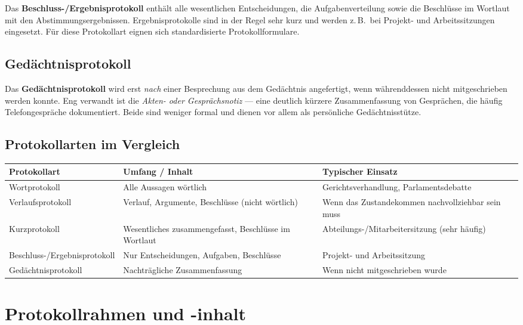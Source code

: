 \documentclass[11pt, a4paper]{article}
\begin{document}
Das \textbf{Beschluss-/Ergebnisprotokoll} enthält alle wesentlichen Entscheidungen, die
Aufgabenverteilung sowie die Beschlüsse im Wortlaut mit den Abstimmungsergebnissen.
Ergebnisprotokolle sind in der Regel sehr kurz und werden z.\,B.\ bei Projekt- und
Arbeitssitzungen eingesetzt. Für diese Protokollart eignen sich standardisierte
Protokollformulare.

\subsection{Gedächtnisprotokoll}

Das \textbf{Gedächtnisprotokoll} wird erst \emph{nach} einer Besprechung aus dem
Gedächtnis angefertigt, wenn währenddessen nicht mitgeschrieben werden konnte. Eng
verwandt ist die \emph{Akten- oder Gesprächsnotiz} --- eine deutlich kürzere
Zusammenfassung von Gesprächen, die häufig Telefongespräche dokumentiert. Beide sind
weniger formal und dienen vor allem als persönliche Gedächtnisstütze.

\subsection{Protokollarten im Vergleich}

\begin{center}
\begin{tabular}{p{3.0cm} p{4.3cm} p{4.7cm}}
\toprule
\textbf{Protokollart} & \textbf{Umfang / Inhalt} & \textbf{Typischer Einsatz}\\
\midrule
Wortprotokoll & Alle Aussagen wörtlich & Gerichtsverhandlung, Parlamentsdebatte\\
Verlaufsprotokoll & Verlauf, Argumente, Beschlüsse (nicht wörtlich) & Wenn das Zustandekommen nachvollziehbar sein muss\\
Kurzprotokoll & Wesentliches zusammengefasst, Beschlüsse im Wortlaut & Abteilungs-/Mitarbeitersitzung (sehr häufig)\\
Beschluss-/Ergebnisprotokoll & Nur Entscheidungen, Aufgaben, Beschlüsse & Projekt- und Arbeitssitzung\\
Gedächtnisprotokoll & Nachträgliche Zusammenfassung & Wenn nicht mitgeschrieben wurde\\
\bottomrule
\end{tabular}
\end{center}

\section{Protokollrahmen und -inhalt}
\end{document}
